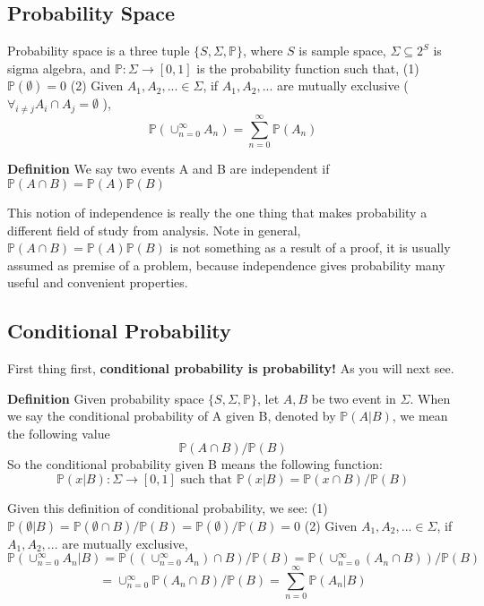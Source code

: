 \documentclass[a4paper,12pt]{article}
\begin{document}
\subsection{Probability Space}
Probability space is a three tuple
$\{ S, \Sigma,  \mathbb{P}\}$,
where $S$ is sample space, $\Sigma\subseteq 2^S$ is sigma algebra, and $\mathbb{P}: \Sigma \to [0, 1]$ is the probability function such that, 
(1) $\mathbb{P}(\emptyset) = 0$ 
(2) Given $A_1, A_2, ... \in \Sigma$, if $A_1, A_2, ...$ are mutually exclusive ( $\forall_{i\neq j} A_i \cap A_j = \emptyset$ ), $$\mathbb{P}( \cup_{n=0}^\infty A_n ) = \sum_{n=0}^\infty \mathbb{P}(A_n)$$

\textbf{Definition} We say two events A and B are independent if $\mathbb{P}(A\cap B) = \mathbb{P}(A)\mathbb{P}(B)$

This notion of independence is really the one thing that makes probability a different field of study from analysis. Note in general, $\mathbb{P}(A\cap B) = \mathbb{P}(A)\mathbb{P}(B)$ is not something as a result of a proof, it is usually assumed as premise of a problem, because independence gives probability many useful and convenient properties. 

\subsection{Conditional Probability}
First thing first, \textbf{conditional probability is probability!} As you will next see.

\textbf{Definition} Given probability space $\{ S, \Sigma,  \mathbb{P}\}$, let $A, B$ be two event in $\Sigma$. When we say the conditional probability of A given B, denoted by $\mathbb{P}(A|B) $, we mean the following value $$\mathbb{P}(A\cap B)/\mathbb{P}(B)$$
So the conditional probability given B means the following function:
$$\mathbb{P}(x|B): \Sigma \to [0, 1] \text{ such that } \mathbb{P}(x|B) = \mathbb{P}(x\cap B)/\mathbb{P}(B)$$

Given this definition of conditional probability, we see: 
(1) $\mathbb{P}(\emptyset|B) = \mathbb{P}(\emptyset\cap B)/\mathbb{P}(B) = \mathbb{P}(\emptyset)/\mathbb{P}(B) = 0$ 
(2) Given $A_1, A_2, ... \in \Sigma$, if $A_1, A_2, ...$ are mutually exclusive, $$\mathbb{P}( \cup_{n=0}^\infty A_n |B ) = \mathbb{P}( (\cup_{n=0}^\infty A_n) \cap B ) /  \mathbb{P}(B)= \mathbb{P}( \cup_{n=0}^\infty (A_n \cap B) ) /  \mathbb{P}(B)$$
$$= \cup_{n=0}^\infty \mathbb{P} ( A_n \cap B ) / \mathbb{P}(B) = \sum_{n=0}^\infty \mathbb{P}(A_n | B)$$ 
\end{document}
